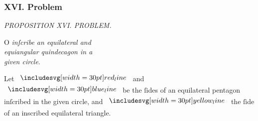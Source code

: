 \documentclass[11pt,preview]{standalone}
\begin{document}
\subsubsection{XVI. Problem}

\begin{minipage}[t]{0.54\textwidth}
    \begin{center}
        \textit{PROPOSITION XVI. PROBLEM.}\label{book4pr16} \\
    \end{center}

    \hfill

    \begin{center}
        \raggedright \lettrine[lines=3, loversize=1, nindent=0pt]{}{}O \textit{inſcribe an equilateral and\\ equiangular quindecagon in a\\ given circle}.
    \end{center}
\end{minipage}%
\hfill
\begin{minipage}[t]{0.43\textwidth}
    \vspace{10pt}
    
\end{minipage}%

\hfill

\raggedright Let $\redline$ and $\blueline$ be the ſides of an equilateral pentagon inſcribed in the given circle, and $\yellowline$ the ſide of an inscribed equilateral triangle.
\end{document}
